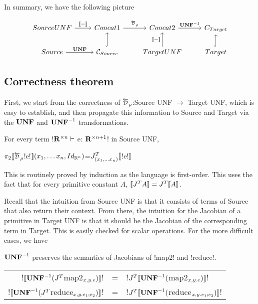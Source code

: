 In summary, we have the following picture

\[
\begin{tikzcd}
    SourceUNF \ar[r,"\sem{-}"] & Concat1 \ar[r,"\Dsynrevsymbol_{\rho}"] & Concat2 \ar[r,"\UNFSymbol^{-1}"] & C_{Target} \\
    Source \ar[r,"\UNFSymbol"] & \CSource \ar[u, hook] & TargetUNF \ar[u,"\sem{-}"] & Target \ar[u, hook] 
\end{tikzcd}
\]

\subsection{Correctness theorem} %
\label{sub:Correctness theorem}

First, we start from the correctness of $\Dsynrevsymbol_{\rho}$:Source UNF $\to$ Target UNF, which is easy to establish, 
and then propagate this information to Source and Target via the $\mathbf{UNF}$ and $\mathbf{UNF}^{-1}$ transformations.

\begin{proposition}
    For every term !$\mathbf{R}^{\times n} \vdash$ e: $\mathbf{R}^{\times n+1}$! in Source UNF,
    \begin{center}
        $\pi_2 \seml \Dsynrevsymbol_{\rho}$!e!$\rrbracket(x_1,\ldots x_n,Id_{\mathbb{R}^n})$=$J^T_{(x_1,\ldots x_n)}\llbracket$!e!$\rrbracket$
    \end{center} 
\end{proposition}

This is routinely proved by induction as the language is first-order. 
This uses the fact that for every primitive constant $A$, $\llbracket J^TA\rrbracket=J^T\llbracket A\rrbracket$.

Recall that the intuition from Source UNF is that it consists of terms of Source that also return their context.
From there, the intuition for the Jacobian of a primitive in Target UNF is that it should be the Jacobian of
the corresponding term in Target. This is easily checked for scalar operations. For the more difficult cases, we have 

\begin{proposition}
$\mathbf{UNF}^{-1}$ preserves the semantics of Jacobians of !map2! and !reduce!.
    \begin{center}
\begin{tabular}{r c l}
    !$\llbracket\mathbf{UNF}^{-1}(J^T$map2$_{x,y.e})\rrbracket$! &=& !$J^T\llbracket\mathbf{UNF}^{-1}($map2$_{x,y.e})\rrbracket$!\\
    !$\llbracket\mathbf{UNF}^{-1}(J^T$reduce$_{x,y.e_1;e_2})\rrbracket$! &=& !$J^T\llbracket\mathbf{UNF}^{-1}($reduce$_{x,y.e_1;e_2})\rrbracket$!
\end{tabular}
\end{center}
\end{proposition}

